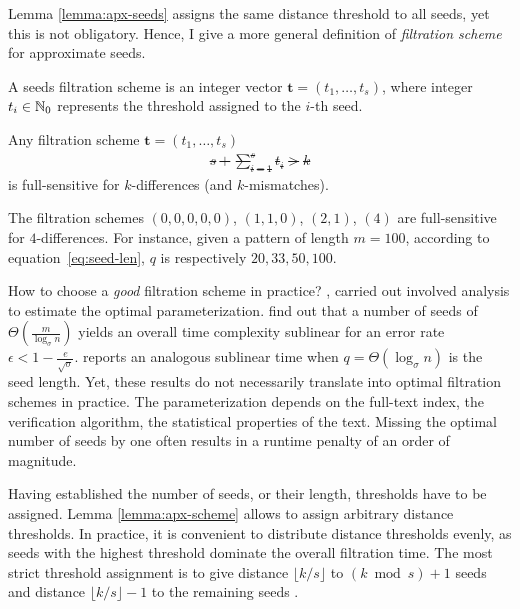 Lemma \ref{lemma:apx-seeds} assigns the same distance threshold to all seeds, yet this is not obligatory.
Hence, I give a more general definition of \emph{filtration scheme} for approximate seeds.
\begin{definition}
A seeds filtration scheme is an integer vector $\mathbf{t} = (t_1, \dots, t_s)$, where integer $t_i \in \mathbb {N}_0$ represents the threshold assigned to the $i$-th seed.
\end{definition}

\begin{lemma}
\label{lemma:apx-scheme}
Any filtration scheme $\mathbf{t} = (t_1, \dots, t_s)$ \st
\begin{eqnarray}
s + \sum_{i=1}^s t_i > k
\end{eqnarray}
is full-sensitive for $k$-differences (and $k$-mismatches).
\end{lemma}

\begin{example}
\label{ex:seeds-apx-scheme}
The filtration schemes $(0,0,0,0,0)$, $(1,1,0)$, $(2,1)$, $(4)$ are full-sensitive for $4$-differences.
For instance, given a pattern of length $m=100$, according to equation~\ref{eq:seed-len}, $q$ is respectively $20, 33, 50, 100$.
\end{example}

How to choose a \emph{good} filtration scheme in practice?
\cite{Myers1994}, \cite{Navarro2000} carried out involved analysis to estimate the optimal parameterization. \citeauthor{Navarro2000} find out that a number of seeds of $\Theta(\frac{m}{\log_{\sigma}{n}})$ yields an overall time complexity sublinear for an error rate $\epsilon < 1 - \frac{e}{\sqrt{\sigma}}$.
\citeauthor{Myers1994} reports an analogous sublinear time when $q=\Theta(\log_{\sigma}{n})$ is the seed length.
Yet, these results do not necessarily translate into optimal filtration schemes in practice.
The parameterization depends on the full-text index, the verification algorithm, the statistical properties of the text.
Missing the optimal number of seeds by one often results in a runtime penalty of an order of magnitude.

Having established the number of seeds, or their length, thresholds have to be assigned.
Lemma \ref{lemma:apx-scheme} allows to assign arbitrary distance thresholds.
In practice, it is convenient to distribute distance thresholds evenly, as seeds with the highest threshold dominate the overall filtration time.
The most strict threshold assignment is to give distance $\lfloor k/s \rfloor$ to $(k \bmod{s}) + 1$ seeds and distance $\lfloor k/s \rfloor - 1$ to the remaining seeds \citep{Siragusa2013}.

